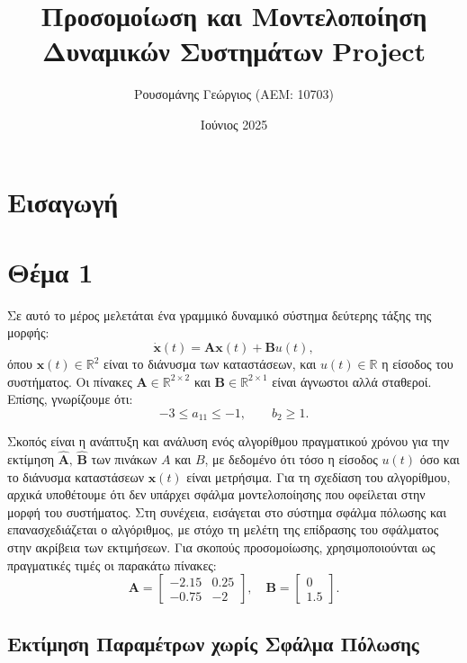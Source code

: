 \documentclass[a4paper,12pt]{article}
\title{Προσομοίωση και Μοντελοποίηση \newline Δυναμικών Συστημάτων \newline 
\selectlanguage{english}Project\selectlanguage{greek}}
\author{Ρουσομάνης Γεώργιος (ΑΕΜ: 10703)}
\date{Ιούνιος 2025}
\begin{document}
\maketitle

\section*{Εισαγωγή}

\section*{Θέμα 1}

Σε αυτό το μέρος μελετάται ένα γραμμικό δυναμικό σύστημα δεύτερης τάξης της μορφής:
\begin{equation}
\dot{\mathbf{x}}(t) = \mathbf{A} \mathbf{x}(t) + \mathbf{B} u(t),
\label{eq:state_space_form}
\end{equation}
όπου $\mathbf{x}(t) \in \mathbb{R}^2$ είναι το διάνυσμα των καταστάσεων, και $u(t) \in \mathbb{R}$ 
η είσοδος του συστήματος. Οι πίνακες $\mathbf{A} \in \mathbb{R}^{2 \times 2}$ και 
$\mathbf{B} \in \mathbb{R}^{2 \times 1}$ είναι άγνωστοι αλλά σταθεροί. Επίσης, γνωρίζουμε ότι:
\begin{equation}
-3 \leq a_{11} \leq -1, \quad \quad b_2 \geq 1.
\label{eq:restrictions}
\end{equation}

Σκοπός είναι η ανάπτυξη και ανάλυση ενός αλγορίθμου πραγματικού χρόνου για την εκτίμηση  
$\hat{\mathbf{A}},\,\hat{\mathbf{B}}$ των πινάκων $A$ και $B$, με δεδομένο ότι τόσο η είσοδος 
$u(t)$ όσο και το διάνυσμα καταστάσεων $\mathbf{x}(t)$ είναι μετρήσιμα. Για τη σχεδίαση του 
αλγορίθμου, αρχικά υποθέτουμε ότι δεν υπάρχει σφάλμα μοντελοποίησης που οφείλεται στην μορφή του 
συστήματος. Στη συνέχεια, εισάγεται στο σύστημα σφάλμα πόλωσης και επανασχεδιάζεται ο αλγόριθμος, 
με στόχο τη μελέτη της επίδρασης του σφάλματος στην ακρίβεια των εκτιμήσεων. Για σκοπούς 
προσομοίωσης, χρησιμοποιούνται ως πραγματικές τιμές οι παρακάτω πίνακες:
\[
\mathbf{A} = 
\begin{bmatrix}
-2.15 & 0.25 \\
-0.75 & -2
\end{bmatrix}, \quad
\mathbf{B} = 
\begin{bmatrix}
0 \\
1.5
\end{bmatrix}.
\]

\subsection*{Εκτίμηση Παραμέτρων χωρίς Σφάλμα Πόλωσης}
\end{document}

